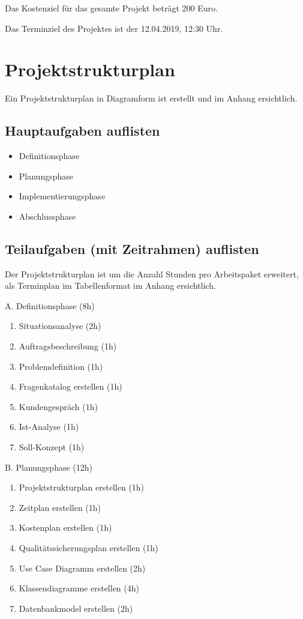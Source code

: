 \documentclass[11pt, a4paper]{article}
\begin{document}
Das Kostenziel für das gesamte Projekt beträgt 200 Euro.

Das Terminziel des Projektes ist der 12.04.2019, 12:30 Uhr.

\section{Projektstrukturplan}
Ein Projektstrukturplan in Diagramform ist erstellt und im Anhang ersichtlich.

\subsection{Hauptaufgaben auflisten}
\begin{itemize}
  \item Definitionsphase
  \item Planungsphase
  \item Implementierungsphase
  \item Abschlussphase
\end{itemize}

\subsection{Teilaufgaben (mit Zeitrahmen) auflisten}
Der Projektstrukturplan ist um die Anzahl Stunden pro Arbeitspaket erweitert,
als Terminplan im Tabellenformat im Anhang ersichtlich.



\noindent A. Definitionsphase (8h)
\begin{enumerate}
  \item Situationsanalyse (2h)
  \item Auftragsbeschreibung (1h)
  \item Problemdefinition (1h)
  \item Fragenkatalog erstellen (1h)
  \item Kundengespräch (1h)
  \item Ist-Analyse (1h)
  \item Soll-Konzept (1h)
\end{enumerate}

\noindent B. Planungsphase (12h)
\begin{enumerate}
  \item Projektstrukturplan erstellen (1h)
  \item Zeitplan erstellen (1h)
  \item Kostenplan erstellen (1h)
  \item Qualitätssicherungsplan erstellen (1h)
  \item Use Case Diagramm erstellen (2h)
  \item Klassendiagramme erstellen (4h)
  \item Datenbankmodel erstellen (2h)
\end{enumerate}
\end{document}
